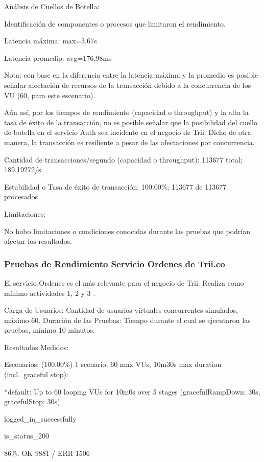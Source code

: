\documentclass[
  paper=a4,
  ,captions=tableheading
]{scrartcl}
\renewenvironment{quote}{\begin{customblockquote}\list{}{\rightmargin=0em\leftmargin=0em}%
\item\relax\color{blockquote-text}\ignorespaces}{\unskip\unskip\endlist\end{customblockquote}}
\begin{document}
Análisis de Cuellos de Botella:

Identificación de componentes o procesos que limitaron el rendimiento.

\begin{quote}
Latencia máxima: max=3.67s

Latencia promedio: avg=176.98ms
\end{quote}

Nota: con base en la diferencia entre la latencia máxima y la promedio
es posible señalar afectación de recursos de la transacción debido a la
concurrencia de los VU (60, para este escenario).

Aún así, por los tiempos de rendimiento (capacidad o throughput) y la
alta la tasa de éxito de la transacción, no es posible señalar que la
posibilidad del cuello de botella en el servicio Auth sea incidente en
el negocio de Trii. Dicho de otra manera, la transacción es resiliente a
pesar de las afectaciones por concurrencia.

\begin{quote}
Cantidad de transacciones/segundo (capacidad o throughput): 113677
total; 189.19272/s

Estabilidad o Tasa de éxito de transacción: 100.00\%; 113677 de 113677
procesados
\end{quote}

Limitaciones:

\begin{quote}
No hubo limitaciones o condiciones conocidas durante las pruebas que
podrían afectar los resultados.
\end{quote}

\subsubsection{Pruebas de Rendimiento Servicio Ordenes de
Trii.co}\label{sec:pruebas-de-rendimiento-servicio-ordenes-de-trii.co}

El servicio Ordenes es el más relevante para el negocio de Trii. Realiza
como mínimo actividades 1, 2 y 3 .

Carga de Usuarios: Cantidad de usuarios virtuales concurrentes
simulados, máximo 60. Duración de las Pruebas: Tiempo durante el cual se
ejecutaron las pruebas, mínimo 10 minutos.

Resultados Medidos:

\begin{quote}
Escenarios: (100.00\%) 1 scenario, 60 max VUs, 10m30s max duration
(incl.~graceful stop):

*default: Up to 60 looping VUs for 10m0s over 5 stages
(gracefulRampDown: 30s, gracefulStop: 30s)

logged\_in\_successfully

is\_status\_200

86\%: OK 9881 / ERR 1506
\end{quote}
\end{document}
